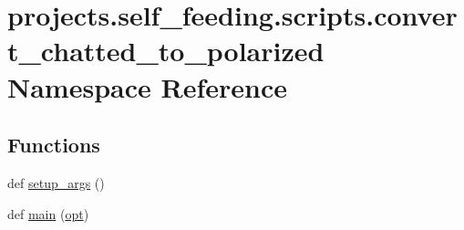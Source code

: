 \hypertarget{namespaceprojects_1_1self__feeding_1_1scripts_1_1convert__chatted__to__polarized}{}\section{projects.\+self\+\_\+feeding.\+scripts.\+convert\+\_\+chatted\+\_\+to\+\_\+polarized Namespace Reference}
\label{namespaceprojects_1_1self__feeding_1_1scripts_1_1convert__chatted__to__polarized}
\subsection*{Functions}
\begin{DoxyCompactItemize}
\item 
def \hyperlink{namespaceprojects_1_1self__feeding_1_1scripts_1_1convert__chatted__to__polarized_a573a5263565e2b06291ce92dd3898524}{setup\+\_\+args} ()
\item 
def \hyperlink{namespaceprojects_1_1self__feeding_1_1scripts_1_1convert__chatted__to__polarized_ac770e55a3dab688df1d4df65d7d5263b}{main} (\hyperlink{namespaceprojects_1_1self__feeding_1_1scripts_1_1convert__chatted__to__polarized_aef1aac8f18e18bcc043ce9e38700bd66}{opt})
\end{DoxyCompactItemize}
